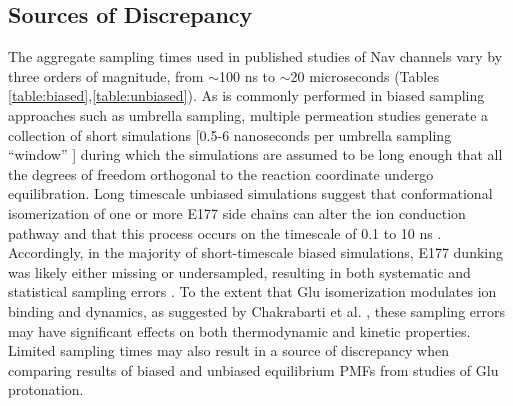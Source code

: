 \begin{refsection}
 \subsection{Sources of Discrepancy }
 The aggregate sampling times used in published studies of Nav channels vary by three orders of magnitude, from $\sim$100 ns to $\sim$20 microseconds (Tables \ref{table:biased},\ref{table:unbiased}).  As is commonly performed in biased sampling approaches such as umbrella sampling, multiple permeation studies generate a collection of short simulations [0.5-6 nanoseconds per umbrella sampling ``window'' \cite{Furini:2014gv,Corry:2012ge,Furini:2012jl,FinolUrdaneta:2014bz,Ngo:2016es}] during which the simulations are assumed to be long enough that all the degrees of freedom orthogonal to the reaction coordinate undergo equilibration.  Long timescale unbiased simulations suggest that conformational isomerization of one or more E177 side chains can alter the ion conduction pathway and that this process occurs on the timescale of 0.1 to 10 ns \cite{Chakrabarti:2013kd,Boiteux:2014ut}.  Accordingly, in the majority of short-timescale biased simulations, E177 dunking was likely either missing or undersampled, resulting in both systematic and statistical sampling errors \cite{Corry:2012ge,Furini:2012jl,FinolUrdaneta:2014bz,Ngo:2016es}. To the extent that Glu isomerization modulates ion binding and dynamics, as suggested by Chakrabarti et al. \cite{Chakrabarti:2013kd}, these sampling errors may have significant effects on both thermodynamic and kinetic properties.  Limited sampling times may also result in a source of discrepancy when comparing results of biased \cite{Furini:2014gv,Corry:2012ge} and unbiased equilibrium PMFs \cite{Boiteux:2014ut} from studies of Glu protonation. 

\end{refsection}
